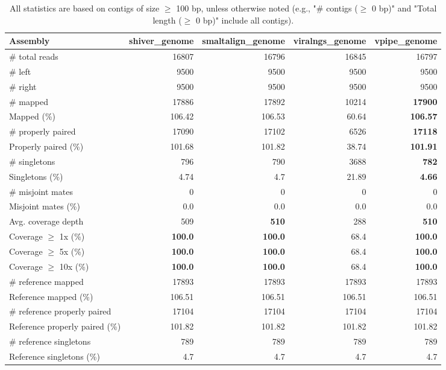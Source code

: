 \documentclass[12pt,a4paper]{article}
\begin{document}
\begin{table}[ht]
\begin{center}
\caption{All statistics are based on contigs of size $\geq$ 100 bp, unless otherwise noted (e.g., "\# contigs ($\geq$ 0 bp)" and "Total length ($\geq$ 0 bp)" include all contigs).}
\begin{tabular}{|l*{4}{|r}|}
\hline
Assembly & shiver\_genome & smaltalign\_genome & viralngs\_genome & vpipe\_genome \\ \hline
\# total reads & 16807 & 16796 & 16845 & 16797 \\ \hline
\# left & 9500 & 9500 & 9500 & 9500 \\ \hline
\# right & 9500 & 9500 & 9500 & 9500 \\ \hline
\# mapped & 17886 & 17892 & 10214 & {\bf 17900} \\ \hline
Mapped (\%) & 106.42 & 106.53 & 60.64 & {\bf 106.57} \\ \hline
\# properly paired & 17090 & 17102 & 6526 & {\bf 17118} \\ \hline
Properly paired (\%) & 101.68 & 101.82 & 38.74 & {\bf 101.91} \\ \hline
\# singletons & 796 & 790 & 3688 & {\bf 782} \\ \hline
Singletons (\%) & 4.74 & 4.7 & 21.89 & {\bf 4.66} \\ \hline
\# misjoint mates & 0 & 0 & 0 & 0 \\ \hline
Misjoint mates (\%) & 0.0 & 0.0 & 0.0 & 0.0 \\ \hline
Avg. coverage depth & 509 & {\bf 510} & 288 & {\bf 510} \\ \hline
Coverage $\geq$ 1x (\%) & {\bf 100.0} & {\bf 100.0} & 68.4 & {\bf 100.0} \\ \hline
Coverage $\geq$ 5x (\%) & {\bf 100.0} & {\bf 100.0} & 68.4 & {\bf 100.0} \\ \hline
Coverage $\geq$ 10x (\%) & {\bf 100.0} & {\bf 100.0} & 68.4 & {\bf 100.0} \\ \hline
\# reference mapped & 17893 & 17893 & 17893 & 17893 \\ \hline
Reference mapped (\%) & 106.51 & 106.51 & 106.51 & 106.51 \\ \hline
\# reference properly paired & 17104 & 17104 & 17104 & 17104 \\ \hline
Reference properly paired (\%) & 101.82 & 101.82 & 101.82 & 101.82 \\ \hline
\# reference singletons & 789 & 789 & 789 & 789 \\ \hline
Reference singletons (\%) & 4.7 & 4.7 & 4.7 & 4.7 \\ \hline

\end{tabular}
\end{center}
\end{table}
\end{document}
